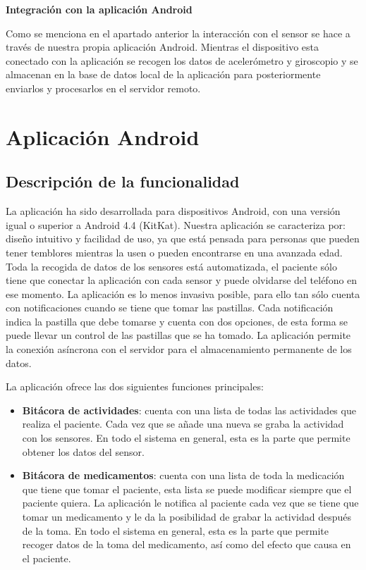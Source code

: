 \documentclass[11pt,spanish]{article}
\begin{document}
{\bf Integración con la aplicación Android}
\newline

Como se menciona en el apartado anterior la interacción con el sensor se hace a través de nuestra propia aplicación Android. Mientras el dispositivo esta conectado con la aplicación se recogen los datos de acelerómetro y giroscopio y se almacenan en la base de datos local de la aplicación para posteriormente enviarlos y procesarlos en el servidor remoto.
\newpage

\section{Aplicación Android}
\subsection{Descripción de la funcionalidad}
La aplicación ha sido desarrollada para dispositivos Android, con una versión igual o superior a Android 4.4 (KitKat). Nuestra aplicación se caracteriza por: diseño intuitivo y facilidad de uso, ya que está pensada para personas que pueden tener temblores mientras la usen o pueden encontrarse en una avanzada edad. Toda la recogida de datos de los sensores está automatizada, el paciente sólo tiene que conectar la aplicación con cada sensor y puede olvidarse del teléfono en ese momento. La aplicación es lo menos invasiva posible, para ello tan sólo cuenta con notificaciones cuando se tiene que tomar las pastillas. Cada notificación indica la pastilla que debe tomarse y cuenta con dos opciones, de esta forma se puede llevar un control de las pastillas que se ha tomado. La aplicación permite la conexión asíncrona con el servidor para el almacenamiento permanente de los datos. 
\newline

La aplicación ofrece las dos siguientes funciones principales:

\begin{itemize}
	\item {\bf Bitácora de actividades}: cuenta con una lista de todas las actividades que realiza el paciente. Cada vez que se añade una nueva se graba la actividad con los sensores. En todo el sistema en general, esta es la parte que permite obtener los datos del sensor.
    \item {\bf Bitácora de medicamentos}: cuenta con una lista de toda la medicación que tiene que tomar el paciente, esta lista se puede modificar siempre que el paciente quiera. La aplicación le notifica al paciente cada vez que se tiene que tomar un medicamento y le da la posibilidad de grabar la actividad después de la toma. En todo el sistema en general, esta es la parte que permite recoger datos de la toma del medicamento, así como del efecto que causa en el paciente.
\end{itemize}
\end{document}
